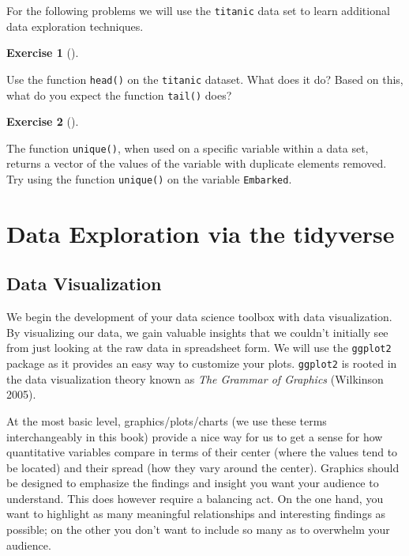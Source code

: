 \documentclass[
  letterpaper,
  DIV=11,
  numbers=noendperiod]{scrreprt}
\theoremstyle{definition}
\newtheorem{exercise}{Exercise}[chapter]
\theoremstyle{remark}
\begin{document}
For the following problems we will use the \texttt{titanic} data set to
learn additional data exploration techniques.

\begin{exercise}[]\protect\hypertarget{exr-ch01-adv1}{}\label{exr-ch01-adv1}

Use the function \texttt{head()} on the \texttt{titanic} dataset. What
does it do? Based on this, what do you expect the function
\texttt{tail()} does?

\end{exercise}

\begin{exercise}[]\protect\hypertarget{exr-ch01-adv2}{}\label{exr-ch01-adv2}

The function \texttt{unique()}, when used on a specific variable within
a data set, returns a vector of the values of the variable with
duplicate elements removed. Try using the function \texttt{unique()} on
the variable \texttt{Embarked}.

\end{exercise}

\part{Data Exploration via the tidyverse}

\hypertarget{sec-viz}{%
\chapter{Data Visualization}\label{sec-viz}}

We begin the development of your data science toolbox with data
visualization. By visualizing our data, we gain valuable insights that
we couldn't initially see from just looking at the raw data in
spreadsheet form. We will use the \texttt{ggplot2} package as it
provides an easy way to customize your plots. \texttt{ggplot2} is rooted
in the data visualization theory known as \emph{The Grammar of Graphics}
(Wilkinson 2005).

At the most basic level, graphics/plots/charts (we use these terms
interchangeably in this book) provide a nice way for us to get a sense
for how quantitative variables compare in terms of their center (where
the values tend to be located) and their spread (how they vary around
the center). Graphics should be designed to emphasize the findings and
insight you want your audience to understand. This does however require
a balancing act. On the one hand, you want to highlight as many
meaningful relationships and interesting findings as possible; on the
other you don't want to include so many as to overwhelm your audience.
\end{document}
